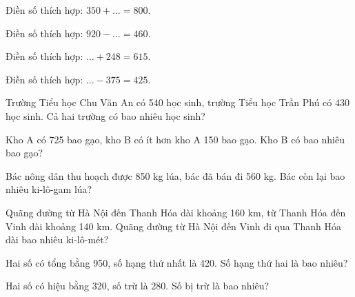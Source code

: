 \begin{ex}
Điền số thích hợp: $350 + \dots = 800$.
\end{ex}

\begin{ex}
Điền số thích hợp: $920 - \dots = 460$.
\end{ex}

\begin{ex}
Điền số thích hợp: $\dots + 248 = 615$.
\end{ex}

\begin{ex}
Điền số thích hợp: $\dots - 375 = 425$.
\end{ex}

\begin{ex}
Trường Tiểu học Chu Văn An có 540 học sinh, trường Tiểu học Trần Phú có 430 học sinh. Cả hai trường có bao nhiêu học sinh?
\end{ex}

\begin{ex}
Kho A có 725 bao gạo, kho B có ít hơn kho A 150 bao gạo. Kho B có bao nhiêu bao gạo?
\end{ex}

\begin{ex}
Bác nông dân thu hoạch được 850 kg lúa, bác đã bán đi 560 kg. Bác còn lại bao nhiêu ki-lô-gam lúa?
\end{ex}

\begin{ex}
Quãng đường từ Hà Nội đến Thanh Hóa dài khoảng 160 km, từ Thanh Hóa đến Vinh dài khoảng 140 km. Quãng đường từ Hà Nội đến Vinh đi qua Thanh Hóa dài bao nhiêu ki-lô-mét?
\end{ex}

\begin{ex}
Hai số có tổng bằng 950, số hạng thứ nhất là 420. Số hạng thứ hai là bao nhiêu?
\end{ex}

\begin{ex}
Hai số có hiệu bằng 320, số trừ là 280. Số bị trừ là bao nhiêu?
\end{ex}

